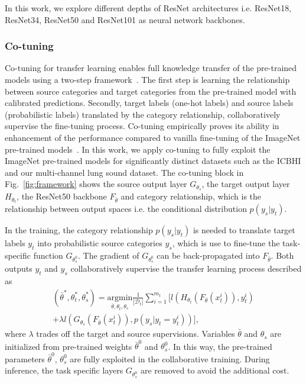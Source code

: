 \documentclass[journal]{IEEEtran}
\begin{document}
In this work, we explore different depths of ResNet architectures i.e. ResNet18,  ResNet34,  ResNet50 and  ResNet101 as neural network backbones.

\subsubsection{Co-tuning}
Co-tuning for transfer learning enables full knowledge transfer of the   pre-trained models using a two-step framework~\cite{you2020co}. The first step is learning the relationship between source categories and target categories from the pre-trained model with calibrated predictions. Secondly, target labels (one-hot labels) and source labels (probabilistic labels) translated by the category relationship, collaboratively supervise the fine-tuning process. Co-tuning empirically proves its ability in enhancement of the performance compared to vanilla fine-tuning of the ImageNet pre-trained models~\cite{you2020co}. In this work, we apply co-tuning to fully exploit the ImageNet pre-trained models for significantly distinct datasets such as the ICBHI  and our multi-channel lung sound dataset. The co-tuning block in Fig.~\ref{fig:framework} shows the source output layer $G_{\theta_s}$, the target output layer $H_{\theta_t}$, the ResNet50 backbone $F_{\bar{\theta}}$ and category relationship, which is the relationship between output spaces i.e. the conditional distribution $p(y_s|y_t)$. 

In the training, the category relationship $p(y_s|y_t)$ is needed to translate target labels $y_t$ into probabilistic source categories $y_s$, which is use to fine-tune the  task-specific function $G_{\theta^0_s}$. The gradient of $G_{\theta^0_s}$ can be back-propagated into $F_{\bar{\theta}}$. Both outputs $y_t$ and $y_s$ collaboratively supervise the transfer learning  process described as
\begin{equation}\label{ctloss}
    \begin{split}
        (\bar{\theta}^*, \theta_{t}^{*}, \theta_{s}^{*})=\underset{\bar{\theta},\theta_t, \theta_s }{\text{argmin}}\frac{1}{\left | \mathcal{D}_t \right |}\sum_{i=1}^{m_t} 
        [ l(H_{\theta_t}(F_{\bar{\theta}}(x^i_t)), y^i_t) \\
        + \lambda l(G_{\theta_s}(F_{\bar{\theta}}(x^{i}_{t})),p(y_s|y_t=y_{t}^{i})) ],
    \end{split}
\end{equation}
where $\lambda$ trades off the target and source supervisions. Variables $\bar{\theta}$ and $\theta_s$ are initialized from pre-trained weights $\bar{\theta}^0$ and $\theta^0_s$. In this way, the pre-trained parameters $\bar{\theta}^0$, $\theta^0_s$ are fully exploited in the collaborative training. During inference, the task specific layers $G_{\theta^0_s}$ are removed to avoid the additional cost.
\end{document}
